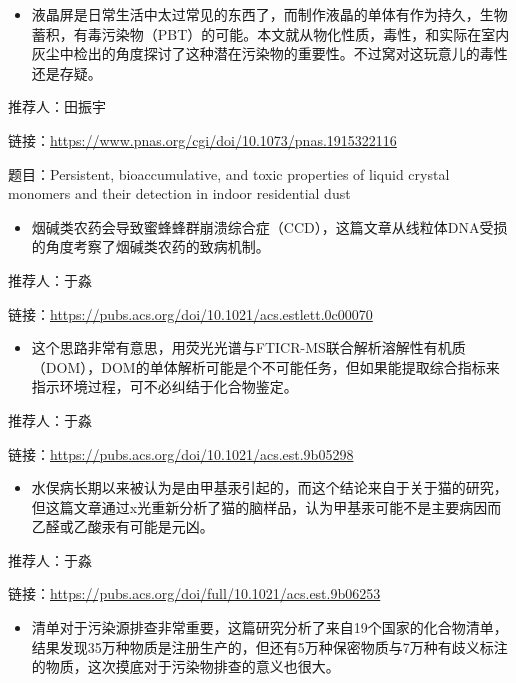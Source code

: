 \documentclass[]{book}
\providecommand{\tightlist}{%
  \setlength{\itemsep}{0pt}\setlength{\parskip}{0pt}}
\begin{document}
\begin{itemize}
\tightlist
\item
  液晶屏是日常生活中太过常见的东西了，而制作液晶的单体有作为持久，生物蓄积，有毒污染物（PBT）的可能。本文就从物化性质，毒性，和实际在室内灰尘中检出的角度探讨了这种潜在污染物的重要性。不过窝对这玩意儿的毒性还是存疑。
\end{itemize}

推荐人：田振宇

链接：\url{https://www.pnas.org/cgi/doi/10.1073/pnas.1915322116}

题目：Persistent, bioaccumulative, and toxic properties of liquid crystal monomers and their detection in indoor residential dust

\begin{itemize}
\tightlist
\item
  烟碱类农药会导致蜜蜂蜂群崩溃综合症（CCD），这篇文章从线粒体DNA受损的角度考察了烟碱类农药的致病机制。
\end{itemize}

推荐人：于淼

链接：\url{https://pubs.acs.org/doi/10.1021/acs.estlett.0c00070}

\begin{itemize}
\tightlist
\item
  这个思路非常有意思，用荧光光谱与FTICR-MS联合解析溶解性有机质（DOM），DOM的单体解析可能是个不可能任务，但如果能提取综合指标来指示环境过程，可不必纠结于化合物鉴定。
\end{itemize}

推荐人：于淼

链接：\url{https://pubs.acs.org/doi/10.1021/acs.est.9b05298}

\begin{itemize}
\tightlist
\item
  水俣病长期以来被认为是由甲基汞引起的，而这个结论来自于关于猫的研究，但这篇文章通过x光重新分析了猫的脑样品，认为甲基汞可能不是主要病因而乙醛或乙酸汞有可能是元凶。
\end{itemize}

推荐人：于淼

链接：\url{https://pubs.acs.org/doi/full/10.1021/acs.est.9b06253}

\begin{itemize}
\tightlist
\item
  清单对于污染源排查非常重要，这篇研究分析了来自19个国家的化合物清单，结果发现35万种物质是注册生产的，但还有5万种保密物质与7万种有歧义标注的物质，这次摸底对于污染物排查的意义也很大。
\end{itemize}
\end{document}
